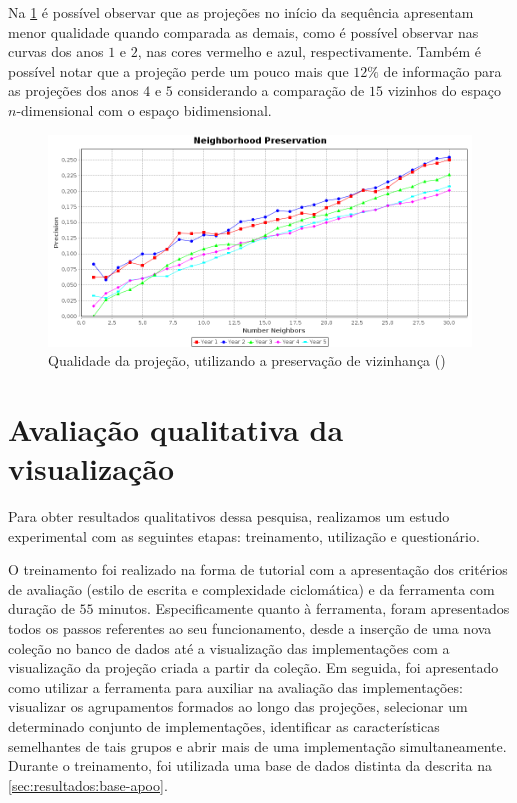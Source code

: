 	Na \cref{fig:neighborhoodAPOO30} é possível observar que as projeções no início da
	sequência apresentam menor qualidade quando comparada as demais, como é possível observar
	nas curvas dos anos $1$ e $2$, nas cores vermelho e azul, respectivamente. Também é
	possível notar que a projeção perde um pouco mais que $12\%$ de informação para as
	projeções dos anos $4$ e $5$ considerando a comparação de $15$ vizinhos do espaço
	$n$-dimensional com o espaço bidimensional.
	
	
	\begin{figure}
		\centering
		\includegraphics[width=0.7\linewidth]{imagem/neighborhoodAPOO30}
		\caption{Qualidade da projeção, utilizando a preservação de vizinhança ()}
		\label{fig:neighborhoodAPOO30}
	\end{figure}	

	
	\section{Avaliação qualitativa da visualização}
	\label{sec:avalQualitativa}
	
		Para obter resultados qualitativos dessa pesquisa, realizamos um estudo experimental com
		as seguintes etapas: treinamento, utilização e questionário.
		
		
		O treinamento foi realizado na forma de tutorial com a apresentação dos critérios
		de avaliação (estilo de escrita e complexidade ciclomática) e da ferramenta com
		duração de $55$ minutos. Especificamente quanto à ferramenta, foram apresentados
		todos os passos referentes ao seu funcionamento, desde a inserção de uma nova
		coleção no banco de dados até a visualização das implementações com a visualização
		da projeção criada a partir da coleção. Em seguida, foi apresentado como utilizar
		a ferramenta para auxiliar na avaliação das implementações: visualizar os
		agrupamentos formados ao longo das projeções, selecionar um determinado conjunto
		de implementações, identificar as características semelhantes de tais grupos e
		abrir mais de uma implementação simultaneamente. Durante o treinamento, foi utilizada uma
		base de dados distinta da descrita na \cref{sec:resultados:base-apoo}.
		
